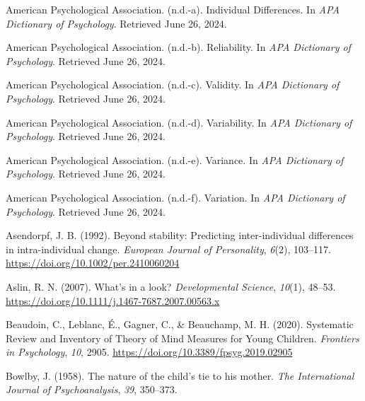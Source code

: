 \documentclass[
]{scrbook}
\newlength{\cslhangindent}
\newenvironment{CSLReferences}[2] %
 {\begin{list}{}{%
  \setlength{\itemindent}{0pt}
  \setlength{\leftmargin}{0pt}
  \setlength{\parsep}{0pt}
  \ifodd #1
   \setlength{\leftmargin}{\cslhangindent}
   \setlength{\itemindent}{-1\cslhangindent}
  \fi
  \setlength{\itemsep}{#2\baselineskip}}}
 {\end{list}}
\begin{document}
\label{refs}
\begin{CSLReferences}{1}{0}
American Psychological Association. (n.d.-a). Individual {Differences}. In \emph{APA Dictionary of Psychology}. Retrieved June 26, 2024.

American Psychological Association. (n.d.-b). Reliability. In \emph{APA Dictionary of Psychology}. Retrieved June 26, 2024.

American Psychological Association. (n.d.-c). Validity. In \emph{APA Dictionary of Psychology}. Retrieved June 26, 2024.

American Psychological Association. (n.d.-d). Variability. In \emph{APA Dictionary of Psychology}. Retrieved June 26, 2024.

American Psychological Association. (n.d.-e). Variance. In \emph{APA Dictionary of Psychology}. Retrieved June 26, 2024.

American Psychological Association. (n.d.-f). Variation. In \emph{APA Dictionary of Psychology}. Retrieved June 26, 2024.

Asendorpf, J. B. (1992). Beyond stability: {Predicting} inter-individual differences in intra-individual change. \emph{European Journal of Personality}, \emph{6}(2), 103--117. \url{https://doi.org/10.1002/per.2410060204}

Aslin, R. N. (2007). What's in a look? \emph{Developmental Science}, \emph{10}(1), 48--53. \url{https://doi.org/10.1111/j.1467-7687.2007.00563.x}

Beaudoin, C., Leblanc, É., Gagner, C., \& Beauchamp, M. H. (2020). Systematic {Review} and {Inventory} of {Theory} of {Mind Measures} for {Young Children}. \emph{Frontiers in Psychology}, \emph{10}, 2905. \url{https://doi.org/10.3389/fpsyg.2019.02905}

Bowlby, J. (1958). The nature of the child's tie to his mother. \emph{The International Journal of Psychoanalysis}, \emph{39}, 350--373.


\end{CSLReferences}
\end{document}
